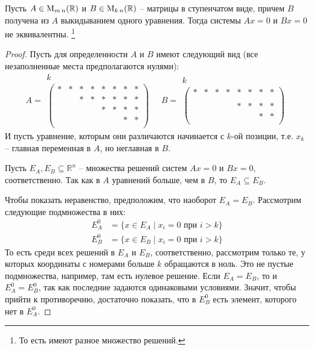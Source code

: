 \begin{claim}
Пусть $A\in\operatorname{M}_{m\,n}(\mathbb R)$ и $B\in\operatorname{M}_{k\,n}(\mathbb R)$ -- матрицы в ступенчатом виде, причем $B$ получена из $A$ выкидыванием одного уравнения.
Тогда системы $Ax = 0$ и $Bx = 0$ не эквивалентны.%
\footnote{То есть имеют разное множество решений.}
\end{claim}
\begin{proof}
Пусть для определенности $A$ и $B$ имеют следующий вид (все незаполненные места предполагаются нулями):
\[
A = 
\begin{matrix}
{k\quad\quad\quad\quad\;}\\
\begin{pmatrix}
{*}&{*}&{*}&{*}&{*}&{*}&{*}&{*}\\
{}&{}&{*}&{*}&{*}&{*}&{*}&{*}\\
{}&{}&{}&{}&{*}&{*}&{*}&{*}\\
{}&{}&{}&{}&{}&{}&{*}&{*}\\
\end{pmatrix}
\end{matrix}
\quad
B =
\begin{matrix}
{k\quad\quad\quad\quad\;}\\
\begin{pmatrix}
{*}&{*}&{*}&{*}&{*}&{*}&{*}&{*}\\
{}&{}&{}&{}&{}&{}&{}&{}\\
{}&{}&{}&{}&{*}&{*}&{*}&{*}\\
{}&{}&{}&{}&{}&{}&{*}&{*}\\
\end{pmatrix}
\end{matrix}
\]
И пусть уравнение, которым они различаются начинается с $k$-ой позиции, т.е. $x_k$ -- главная переменная в $A$, но неглавная в $B$.

Пусть $E_A, E_B\subseteq \mathbb R^n$ -- множества решений систем $Ax = 0$ и $Bx = 0$, соответственно.
Так как в $A$ уравнений больше, чем в $B$, то $E_A \subseteq E_B$. 

Чтобы показать неравенство, предположим, что наоборот $E_A = E_B$.
Рассмотрим следующие подмножества в них:
\begin{align*}
E_A^0 &= \{x\in E_A\mid x_i = 0\text{ при }i>k\}\\
E_B^0 &= \{x\in E_B\mid x_i = 0\text{ при }i>k\}
\end{align*}
То есть среди всех решений в $E_A$ и $E_B$, соответственно, рассмотрим только те, у которых координаты с номерами больше $k$ обращаются в ноль.
Это не пустые подмножества, например, там есть нулевое решение.
Если $E_A = E_B$, то и $E_A^0 = E_B^0$, так как последние задаются одинаковыми условиями.
Значит, чтобы прийти к противоречию, достаточно показать, что в $E_B^0$ есть элемент, которого нет в $E_A^0$. 


\end{proof}
